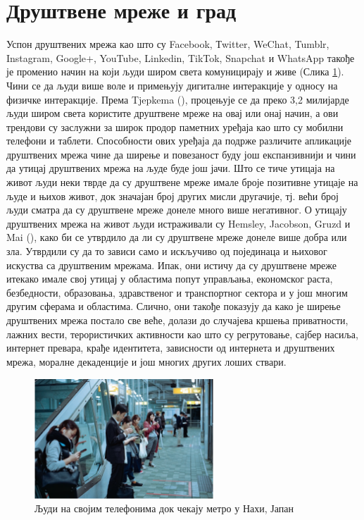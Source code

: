 \documentclass{article}
\begin{document}
\section{Друштвене мреже и град}
Успон друштвених мрежа као што су Facebook, Тwitter, WeChat, Tumblr, Instagram, Google+, YouTube, Linkedin, TikTok, Snapchat и WhatsApp такође је променио начин на који људи широм света комуницирају и живе (Слика \ref{fig:mreze}). Чини се да људи више воле и примењују дигиталне интеракције у односу на физичке интеракције. Према Tjepkema (\cite{t_2019}), процењује се да преко 3,2 милијарде људи широм света користите друштвене мреже на овај или онај начин, а ови трендови су заслужни за широк продор паметних уређаја као што су мобилни телефони и таблети. Способности ових уређаја да подрже различите апликације друштвених мрежа чине да ширење и повезаност буду још експанзивнији и чини да утицај друштвених мрежа на људе буде још јачи. Што се тиче утицаја на живот људи неки тврде да су друштвене мреже имале броје позитивне утицаје на људе и њихов живот, док значајан број других мисли другачије, тј. већи број људи сматра да су друштвене мреже донеле много више негативног. О утицају друштвених мрежа на живот људи истраживали су  Hemsley, Jacobson, Gruzd и Mai (\cite{m_2018}), како би се утврдило да ли су друштвене мреже донеле више добра или зла. Утврдили су да то зависи само и искључиво од појединаца и њиховог искуства са друштвеним мрежама. Ипак, они истичу да су друштвене мреже итекако имале свој утицај у областима попут управљања, економског раста, безбедности, образовања, здравственог и транспортног сектора и у још многим другим сферама и областима. Слично, они такође показују да како је ширење друштвених мрежа постало све веће, долази до случајева кршења приватности, лажних вести, терористичких активности као што су регрутовање, сајбер насиља, интернет превара, крађе идентитета, зависности од интернета и друштвених мрежа, моралне декаденције и још многих других лоших ствари. \\
\begin{figure}[h!]
\centering
\includegraphics[width=0.6\textwidth]{slike/drustvene_mreze.png}
\caption{\label{fig:mreze}Људи на својим телефонима док чекају метро у Нахи, Јапан}
\end{figure}
\end{document}
